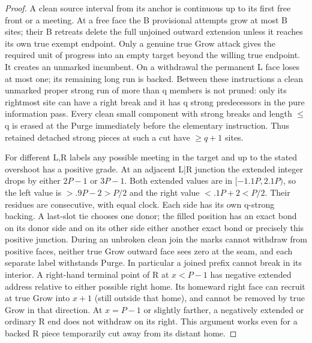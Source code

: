 \begin{proof}
A clean source interval from its anchor is continuous up to its first free front or a meeting. At a free face the B provisional attempts grow at most B sites; their B retreats delete the full unjoined outward extension unless it reaches its own true exempt endpoint. Only a genuine true Grow attack gives the required unit of progress into an empty target beyond the willing true endpoint. It creates an unmarked incumbent. On a withdrawal the permanent L face loses at most one; its remaining long run is backed. Between these instructions a clean unmarked proper strong run of more than q members is not pruned: only its rightmost site can have a right break and it has q strong predecessors in the pure information pass. Every clean small component with strong breaks and length \(\le\)q is erased at the Purge immediately before the elementary instruction. Thus retained detached strong pieces at such a cut have \(\ge\)\(q+1\) sites.

For different L,R labels any possible meeting in the target and up to the stated overshoot has a positive grade. At an adjacent L|R junction the extended integer drops by either \(2P- 1\) or \(3P- 1\). Both extended values are in \([- 1.1P,2.1P)\), so the left value is \(>.9P- 2>P/2\) and the right value \(<.1P+2<P/2\). Their residues are consecutive, with equal clock. Each side has its own q-strong backing. A last-slot tie chooses one donor; the filled position has an exact bond on its donor side and on its other side either another exact bond or precisely this positive junction. During an unbroken clean join the marks cannot withdraw from positive faces, neither true Grow outward face sees zero at the seam, and each separate label withstands Purge. In particular a joined prefix cannot break in its interior. A right-hand terminal point of R at \(x<P- 1\) has negative extended address relative to either possible right home. Its homeward right face can recruit at true Grow into \(x+1\) (still outside that home), and cannot be removed by true Grow in that direction. At \(x=P- 1\) or slightly farther, a negatively extended or ordinary R end does not withdraw on its right. This argument works even for a backed R piece temporarily cut away from its distant home.


\end{proof}

